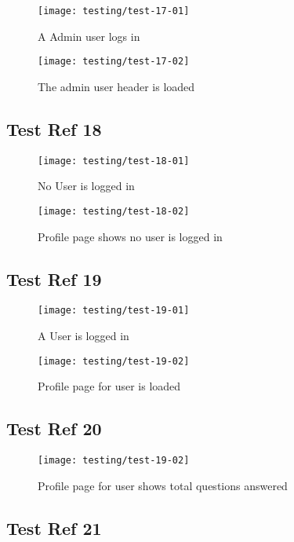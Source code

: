 \begin{figure}[H]
\centering
\texttt{[image: testing/test-17-01]}
\caption{A Admin user logs in}
\label{test-17-03}
\end{figure}

\begin{figure}[H]
\centering
\texttt{[image: testing/test-17-02]}
\caption{The admin user header is loaded}
\label{test-17-04}
\end{figure}

\subsection{Test Ref 18}

\begin{figure}[H]
\centering
\texttt{[image: testing/test-18-01]}
\caption{No User is logged in}
\label{test-18-01}
\end{figure}

\begin{figure}[H]
\centering
\texttt{[image: testing/test-18-02]}
\caption{Profile page shows no user is logged in}
\label{test-18-01}
\end{figure}

\subsection{Test Ref 19}

\begin{figure}[H]
\centering
\texttt{[image: testing/test-19-01]}
\caption{A User is logged in}
\label{test-19-01}
\end{figure}

\begin{figure}[H]
\centering
\texttt{[image: testing/test-19-02]}
\caption{Profile page for user is loaded}
\label{test-19-01}
\end{figure}

\subsection{Test Ref 20}

\begin{figure}[H]
\centering
\texttt{[image: testing/test-19-02]}
\caption{Profile page for user shows total questions answered}
\label{test-20-01}
\end{figure}

\subsection{Test Ref 21}

